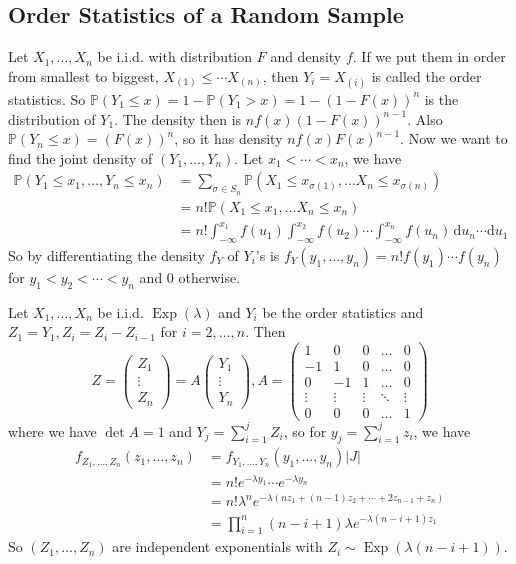 \subsection{Order Statistics of a Random Sample}
Let $X_1,\ldots,X_n$ be i.i.d. with distribution $F$ and density $f$.
If we put them in order from smallest to biggest, $X_{(1)}\le \cdots X_{(n)}$, then $Y_i=X_{(i)}$ is called the order statistics.
So $\mathbb P(Y_1\le x)=1-\mathbb P(Y_1>x)=1-(1-F(x))^n$ is the distribution of $Y_1$.
The density then is $nf(x)(1-F(x))^{n-1}$.
Also $\mathbb P(Y_n\le x)=(F(x))^n$, so it has density $nf(x)F(x)^{n-1}$.
Now we want to find the joint density of $(Y_1,\ldots,Y_n)$.
Let $x_1<\cdots<x_n$, we have
\begin{align*}
    \mathbb P(Y_1\le x_1,\ldots,Y_n\le x_n)&=\sum_{\sigma\in S_n}\mathbb P(X_1\le x_{\sigma(1)},\ldots X_n\le x_{\sigma(n)})\\
    &=n!\mathbb P(X_1\le x_1,\ldots X_n\le x_n)\\
    &=n!\int_{-\infty}^{x_1}f(u_1)\int_{-\infty}^{x_2}f(u_2)\cdots\int_{-\infty}^{x_n}f(u_n)\,\mathrm du_n\cdots\mathrm  du_1
\end{align*}
So by differentiating the density $f_Y$ of $Y_i$'s is $f_Y(y_1,\ldots,y_n)=n!f(y_1)\cdots f(y_n)$ for $y_1<y_2<\cdots<y_n$ and $0$ otherwise.
\begin{example}
    Let $X_1,\ldots,X_n$ be i.i.d. $\operatorname{Exp}(\lambda)$ and $Y_i$ be the order statistics and $Z_1=Y_1,Z_i=Z_i-Z_{i-1}$ for $i=2,\ldots,n$.
    Then
    $$Z=\begin{pmatrix}
        Z_1\\
        \vdots\\
        Z_n
    \end{pmatrix}=A\begin{pmatrix}
        Y_1\\
        \vdots\\
        Y_n
    \end{pmatrix},A=\begin{pmatrix}
        1&0&0&\dots&0\\
        -1&1&0&\dots&0\\
        0&-1&1&\dots&0\\
        \vdots&\vdots&\vdots&\ddots&\vdots\\
        0&0&0&\dots&1
    \end{pmatrix}$$
    where we have $\det A=1$ and $Y_j=\sum_{i=1}^jZ_i$, so for $y_j=\sum_{i=1}^jz_i$, we have
    \begin{align*}
        f_{Z_1,\ldots,Z_n}(z_1,\ldots,z_n)&=f_{Y_1,\ldots,Y_n}(y_1,\ldots,y_n)|J|\\
        &=n!e^{-\lambda y_1}\cdots e^{-\lambda y_n}\\
        &=n!\lambda^ne^{-\lambda(nz_1+(n-1)z_2+\cdots +2z_{n-1}+z_n)}\\
        &=\prod_{i=1}^n(n-i+1)\lambda e^{-\lambda(n-i+1)z_1}
    \end{align*}
    So $(Z_1,\ldots,Z_n)$ are independent exponentials with $Z_i\sim\operatorname{Exp}(\lambda(n-i+1))$.
\end{example}